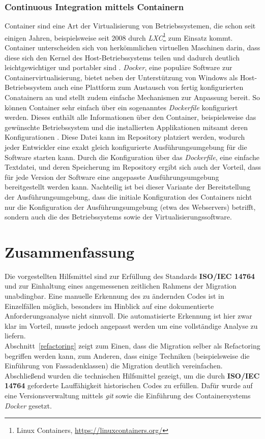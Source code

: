         \subsubsection{Continuous Integration mittels Containern}
        Container sind eine Art der Virtualisierung von Betriebssystemen, die schon seit einigen Jahren, beispielsweise 
        seit 2008 durch \textit{LXC}\footnote{Linux Containers, \url{https://linuxcontainers.org/}} zum Einsatz kommt. 
        Container unterscheiden sich von herkömmlichen virtuellen Maschinen darin, dass diese sich den Kernel des 
        Host-Betriebssystems teilen und dadurch deutlich leichtgewichtiger und portabler sind \cite{scheepers_virtualization_2014}. 
        \textit{Docker}, eine populäre Software zur Containervirtualisierung, bietet neben der Unterstützung von Windows als Host-Betriebssystem 
        auch eine Plattform zum Austausch von fertig konfigurierten Conatainern an und stellt zudem einfache 
        Mechanismen zur Anpassung bereit. So können Container sehr einfach über ein sogenanntes \textit{Dockerfile} konfiguriert 
        werden. Dieses enthält alle Informationen über den Container, beispielsweise das gewünschte Betriebssystem und die 
        installierten Applikationen mitsamt deren Konfigurationen \cite{anderson_docker_2015}. Diese Datei kann im Repository platziert werden, wodurch jeder 
        Entwickler eine exakt gleich konfigurierte Ausführungsumgebung für die Software starten kann. Durch die Konfiguration 
        über das \textit{Dockerfile}, eine einfache Textdatei, und deren Speicherung im Repository ergibt sich auch der Vorteil, 
        dass für jede Version der Software eine angepasste Ausführungsumgebung bereitgestellt werden kann. Nachteilig ist bei
        dieser Variante der Bereitstellung der Ausführungsumgebung, dass die initiale Konfiguration des Containers nicht nur 
        die Konfiguration der Ausführungsumgebung (etwa des Webservers) betrifft, sondern auch die des Betriebssystems sowie 
        der Virtualisierungssoftware.

\section{Zusammenfassung}
Die vorgestellten Hilfsmittel sind zur Erfüllung des Standards \textbf{ISO/IEC 14764} und zur Einhaltung eines angemessenen 
zeitlichen Rahmens der Migration unabdingbar. Eine manuelle Erkennung des zu ändernden Codes ist in Einzelfällen möglich, 
besonders im Hinblick auf eine dokumentierte Anforderungsanalyse nicht sinnvoll. Die automatisierte Erkennung ist hier 
zwar klar im Vorteil, musste jedoch angepasst werden um eine vollständige Analyse zu liefern. \\
Abschnitt~\ref{refactoring} zeigt zum Einen, dass die Migration selber als Refactoring begriffen werden kann, zum Anderen, dass 
einige Techniken (beispielsweise die Einführung von Fassadenklassen) die Migration deutlich vereinfachen. \\
Abschließend wurden die technischen Hilfsmittel gezeigt, um die durch \textbf{ISO/IEC 14764} geforderte Lauffähigkeit historischen 
Codes zu erfüllen. Dafür wurde auf eine Versionsverwaltung mittels \textit{git} sowie die Einführung des Containersystems 
\textit{Docker} gesetzt.
